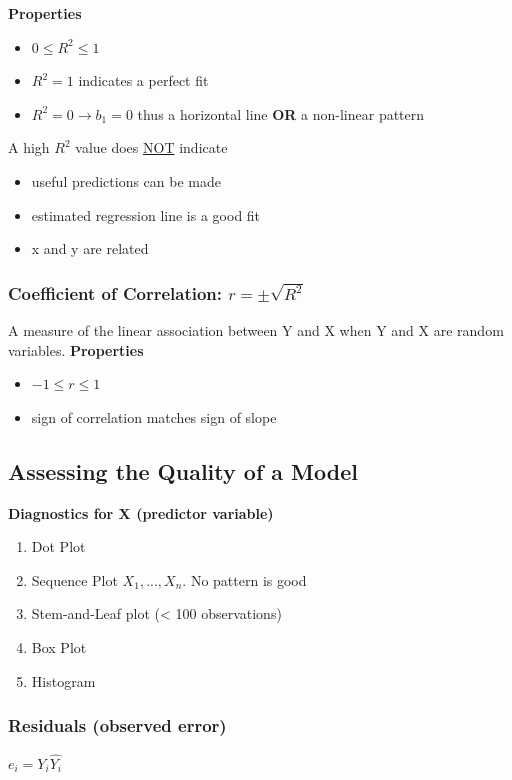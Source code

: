\documentclass[11pt]{article}
\begin{document}
\textbf{Properties}
\begin{itemize}
\item \(0 \leq R^2 \leq 1\)
\item \(R^2 = 1\) indicates a perfect fit
\item \(R^2 = 0 \to b_1 = 0\) thus a horizontal line \textbf{OR} a non-linear pattern
\end{itemize}

A high \(R^2\) value does \uline{NOT} indicate
\begin{itemize}
\item useful predictions can be made
\item estimated regression line is a good fit
\item x and y are related
\end{itemize}
\subsubsection{Coefficient of Correlation: \(r = \pm \sqrt{R^2}\)}
\label{sec:org33d3c3c}
A measure of the linear association between Y and X when Y and X are random variables.
\textbf{Properties}
\begin{itemize}
\item \(-1 \leq r \leq 1\)
\item sign of correlation matches sign of slope
\end{itemize}

\subsection{Assessing the Quality of a Model}
\label{sec:org2739620}

\textbf{Diagnostics for X (predictor variable)}
\begin{enumerate}
\item Dot Plot
\item Sequence Plot
\(X_1, ..., X_n\). No pattern is good
\item Stem-and-Leaf plot (< 100 observations)
\item Box Plot
\item Histogram
\end{enumerate}

\subsubsection{Residuals (observed error)}
\label{sec:orgc2dd5a2}
\(e_i = Y_i \hat{Y_i}\)
\end{document}
